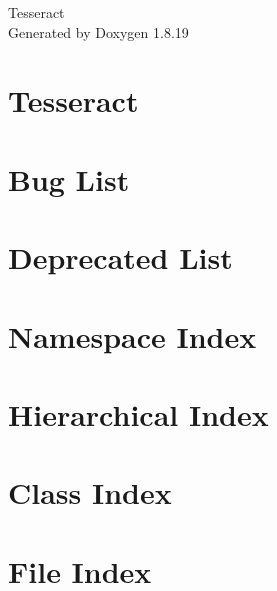 \let\mypdfximage\pdfximage\def\pdfximage{\immediate\mypdfximage}\documentclass[twoside]{book}
\newcommand{\+}{\discretionary{\mbox{\scriptsize$\hookleftarrow$}}{}{}}
\newcommand{\clearemptydoublepage}{%
  \newpage{\pagestyle{empty}\cleardoublepage}%
}
\begin{document}
\hypersetup{pageanchor=false,
             bookmarksnumbered=true,
             pdfencoding=unicode
            }
\begin{titlepage}
\vspace*{7cm}
\begin{center}%
{\Large Tesseract }\\
\vspace*{1cm}
{\large Generated by Doxygen 1.8.19}\\
\end{center}
\end{titlepage}
\clearemptydoublepage
{}
\tableofcontents
\clearemptydoublepage
{}
\hypersetup{pageanchor=true}

\chapter{Tesseract}
\label{index}\hypertarget{index}{}
\chapter{Bug List}
\label{bug}

\chapter{Deprecated List}
\label{deprecated}

\chapter{Namespace Index}

\chapter{Hierarchical Index}

\chapter{Class Index}

\chapter{File Index}

\end{document}
